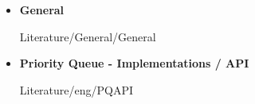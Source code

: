 \begin{itemize}
  \item
    \textbf{General}
    \begin{btSect}{Literature/General/General}
      \btPrintAll
    \end{btSect}
\end{itemize}
\newpage
\begin{itemize}
  \item
    \textbf{Priority Queue - Implementations / API}
    \begin{btSect}{Literature/eng/PQAPI}
      \btPrintAll
    \end{btSect}
\end{itemize}